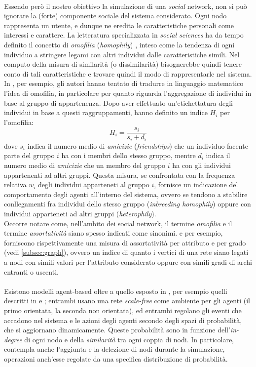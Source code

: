 \documentclass[a4paper,12pt]{article}
\begin{document}
\\
Essendo però il nostro obiettivo la simulazione di una \textit{social} network, non si può ignorare la (forte) componente sociale del sistema considerato. Ogni nodo rappresenta un utente, e dunque ne eredita le caratteristiche personali come interessi e carattere. La letteratura specializzata in \textit{social sciences} ha da tempo definito il concetto di \textit{omofilia} (\textit{homophily}) \cite{homo} \cite{newman}, inteso come la tendenza di ogni individuo a stringere legami con altri individui dalle caratteristiche simili. Nel computo della misura di similarità (o dissimilarità) bisognerebbe quindi tenere conto di tali caratteristiche e trovare quindi il modo di rappresentarle nel sistema. In \cite{group}, per esempio, gli autori hanno tentato di tradurre in linguaggio matematico l'idea di omofilia, in particolare per quanto riguarda l'aggregazione di individui in base al gruppo di appartenenza. Dopo aver effettuato un'etichettatura degli individui in base a questi raggruppamenti, hanno definito un indice  $H_i$ per l'omofilia:
\begin{equation}
H_i = \dfrac{s_i}{s_i + d_i}
\end{equation}
dove $s_i$ indica il numero medio di \textit{amicizie} (\textit{friendships}) che un individuo facente parte del gruppo $i$ ha con i membri dello stesso gruppo, mentre $d_i$ indica il numero medio di \textit{amicizie} che un membro del gruppo $i$ ha con gli individui appartenenti ad altri gruppi. Questa misura, se confrontata con la frequenza relativa $w_i$ degli individui apparteneti al gruppo $i$, fornisce un indicazione del comportamento degli agenti all'interno del sistema, ovvero se tendono a stabilire conllegamenti fra individui dello stesso gruppo (\textit{inbreeding homophily}) oppure con individui apparteneti ad altri gruppi (\textit{heterophily}).\\
Occorre notare come, nell'ambito dei social network, il termine \textit{omofilia} e il termine \textit{assortatività} siano spesso indicati come sinonimi. \cite{assor} e \cite{mixing} per esempio, forniscono rispettivamente una misura di assortatività per attributo e per grado (vedi \ref{subsec:graph}), ovvero un indice di quanto i vertici di una rete siano legati a nodi con simili valori per l'attributo considerato oppure con simili gradi di archi entranti o uscenti.
\\
\\
Esistono modelli agent-based oltre a quello esposto in \cite{gilbert}, per esempio quelli descritti in \cite{red} e \cite{det}; entrambi usano una rete \textit{scale-free} come ambiente per gli agenti (il primo orientata, la seconda non orientata), ed entrambi regolano gli eventi che accadono nel sistema e le azioni degli agenti secondo degli spazi di probabilità, che si aggiornano dinamicamente. Queste probabilità sono in funzione dell'\textit{in-degree} di ogni nodo e della \textit{similarità} tra ogni coppia di nodi. In particolare, \cite{red} contempla anche l'aggiunta e la delezione di nodi durante la simulazione, operazioni anch'esse regolate da una specifica distribuzione di probabilità. \\
\end{document}
